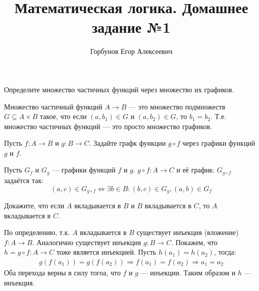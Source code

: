 
\title{Математическая логика. Домашнее задание №1}
\author{Горбунов Егор Алексеевич}


\maketitle

\begin{task}[1]
Определите множество частичных функций через множество их графиков.
\end{task}
\begin{solution}
Множество частичный функций $A \rightarrow B$ --- это множество подмножеств $G \subseteq A \times B$ такое, что если $(a, b_1) \in G$ и $(a, b_2) \in G$, то $b_1 = b_2$. Т.е. множество частичных функций --- это просто множество графиков.
\end{solution}

\begin{task}[2]
Пусть $f:A\rightarrow B$ и $g:B \rightarrow C$. Задайте графк функции $g \circ f$ через графики функций $g$ и $f$.
\end{task}
\begin{solution} Пусть $G_f$ и $G_g$ --- графики функций $f$ и $g$.
$g\circ f: A \rightarrow C$ и её график: $G_{g\circ f}$ задаётся так:
\[
	(a, c) \in G_{g\circ f} \iff \exists b \in B : (b, c) \in G_g, (a, b) \in G_f
\]
\end{solution}

\begin{task}[3]
Докажите, что если $A$ вкладывается в $B$ и $B$ вкладывается в $C$, то $A$ вкладывается в $C$.
\end{task}
\begin{solution}
По определению, т.к. $A$ вкладывается в $B$ существует инъекция (вложение) $f:A \rightarrow B$.
Аналогично существует инъекция $g:B \rightarrow C$. Покажем, что $h = g \circ f: A \rightarrow C$ тоже является инъекцией. Пусть $h(a_1) = h(a_2)$, тогда:
\begin{equation*}
\begin{split}
g(f(a_1)) = g(f(a_2)) \Rightarrow f(a_1) = f(a_2) \Rightarrow a_1 = a_2
\end{split}
\end{equation*}
Оба перехода верны в силу тогоа, что $f$ и $g$ --- инъекции. Таким образом и $h$ --- инъекция. \xqed
\end{solution}

